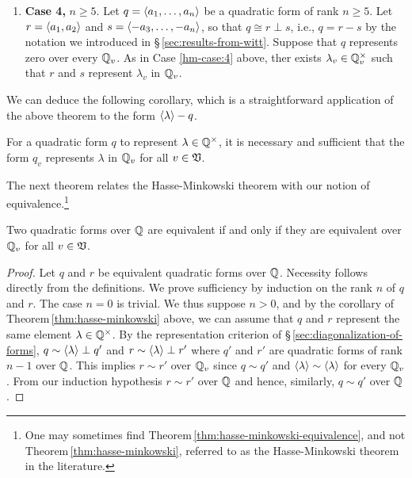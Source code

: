 \begin{enumerate}[wide, nosep, label=(\alph*)]
    \item \textbf{Case 4,} \(n \geq 5\). Let \(q = \langle a_1, \dots, a_n \rangle\)
    be a quadratic form of rank \(n \geq 5\). Let \(r = \langle a_1, a_2 \rangle\)
    and \(s = \langle -a_3, \dots, -a_n \rangle\), so that \(q \cong r \perp s\),
    i.e., \(q = r - s\) by the notation we introduced in
    \S\,\ref{sec:results-from-witt}. Suppose that \(q\) represents zero over
    every \(\mathbb{Q}_v\). As in Case \ref{hm-case:4} above, ther exists
    \(\lambda_v \in \mathbb{Q}_v^{\times}\) such that \(r\) and \(s\) represent
    \(\lambda_v\) in \(\mathbb{Q}_v\). 
\end{enumerate}

\medskip

We can deduce the following corollary, which is a straightforward application of
the above theorem to the form \(\langle \lambda \rangle - q\).

\begin{corollary}
    For a quadratic form \(q\) to represent \(\lambda \in \mathbb{Q}^{\times}\),
    it is necessary and sufficient that the form \(q_v\) represents \(\lambda\)
    in \(\mathbb{Q}_v\) for all \(v \in \mathfrak{V}\).
\end{corollary}

The next theorem relates the Hasse-Minkowski theorem with our notion of
equivalence.\footnote{One may sometimes find
Theorem\,\ref{thm:hasse-minkowski-equivalence}, and not
Theorem\,\ref{thm:hasse-minkowski}, referred to as the Hasse-Minkowski theorem
in the literature.}

\begin{theoremx}\label{thm:hasse-minkowski-equivalence} Two quadratic forms over
    \(\mathbb{Q}\) are equivalent if and only if they are equivalent over
    \(\mathbb{Q}_v\) for all \(v \in \mathfrak{V}\).
\end{theoremx}

\begin{proof}
    Let \(q\) and \(r\) be equivalent quadratic forms over \(\mathbb{Q}\).
    Necessity follows directly from the definitions. We prove sufficiency by
    induction on the rank \(n\) of \(q\) and \(r\). The case \(n = 0\) is
    trivial. We thus suppose \(n > 0\), and by the corollary of
    Theorem\,\ref{thm:hasse-minkowski} above, we can assume that \(q\) and \(r\)
    represent the same element \(\lambda \in \mathbb{Q}^{\times}\). By the
    representation criterion of \S\,\ref{sec:diagonalization-of-forms}, \(q \sim
    \langle \lambda \rangle \perp q'\) and \(r \sim \langle \lambda \rangle \perp r'\)
    where \(q'\) and \(r'\) are quadratic forms of rank \(n - 1\) over
    \(\mathbb{Q}\). This implies \(r \sim r'\) over \(\mathbb{Q}_v\) since \(q
    \sim q'\) and \(\langle \lambda \rangle \sim \langle \lambda \rangle\) for every
    \(\mathbb{Q}_v\). From our induction hypothesis \(r \sim r'\) over
    \(\mathbb{Q}\) and hence, similarly, \(q \sim q'\) over \(\mathbb{Q}\).
\end{proof}

